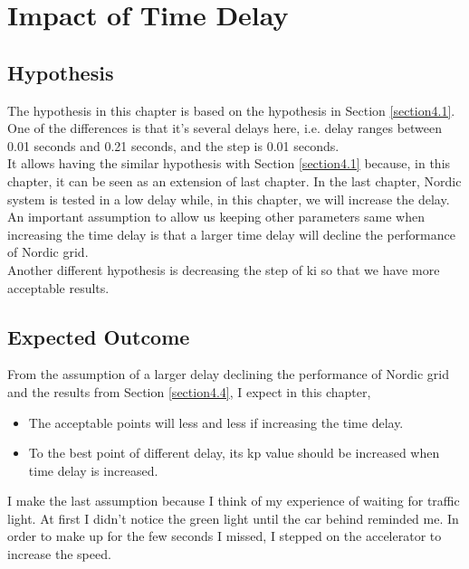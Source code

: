 \documentclass{report}
\begin{document}
\chapter{Impact of Time Delay}
\label{Chapter5}
\section{Hypothesis} %
The hypothesis in this chapter is based on the hypothesis in Section \textcolor{red}{\ref{section4.1}}. \\
 
One of the differences is that it's several delays here, i.e. delay ranges between 0.01 seconds and 0.21 seconds, and the step is 0.01 seconds. \\

It allows having the similar hypothesis with Section \textcolor{red}{\ref{section4.1}} because, in this chapter, it can be seen as an extension of last chapter. In the last chapter, Nordic system is tested in a low delay while, in this chapter, we will increase the delay. \\

An important assumption to allow us keeping other parameters same when increasing the time delay is that a larger time delay will decline the performance of Nordic grid. \\

Another different hypothesis is decreasing the step of ki so that we have more acceptable results. \\

\section{Expected Outcome} %
\label{section5.2}
From the assumption of a larger delay declining the performance of Nordic grid and the results from Section \textcolor{red}{\ref{section4.4}}, I expect in this chapter,\\

\begin{itemize}
    \item The acceptable points will less and less if increasing the time delay. \\
    \item To the best point of different delay, its kp value should be increased when time delay is increased. \\
\end{itemize}


I make the last assumption because I think of my experience of waiting for traffic light. At first I didn't notice the green light until the car behind reminded me. In order to make up for the few seconds I missed, I stepped on the accelerator to increase the speed.\\ 
\end{document}

